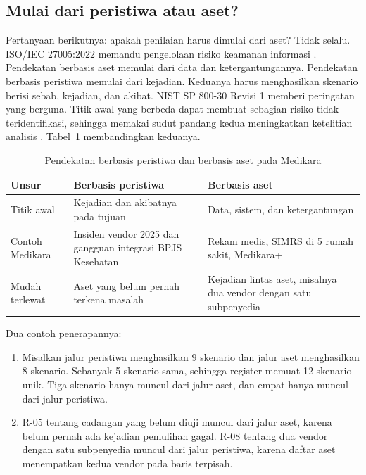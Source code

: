 \subsection*{Mulai dari peristiwa atau aset?}

Pertanyaan berikutnya: apakah penilaian harus dimulai dari aset? Tidak selalu. ISO/IEC 27005:2022
memandu pengelolaan risiko keamanan informasi \cite{iso27005-2022}. Pendekatan berbasis aset memulai
dari data dan ketergantungannya. Pendekatan berbasis peristiwa memulai dari kejadian. Keduanya harus
menghasilkan skenario berisi sebab, kejadian, dan akibat. NIST SP 800-30 Revisi 1 memberi peringatan
yang berguna. Titik awal yang berbeda dapat membuat sebagian risiko tidak teridentifikasi, sehingga
memakai sudut pandang kedua meningkatkan ketelitian analisis \cite{c05-nist-sp80030r1}.
Tabel~\ref{tab:ch05-pendekatan} membandingkan keduanya.

\begin{table}[!htb]
  \centering\small
  \caption{Pendekatan berbasis peristiwa dan berbasis aset pada Medikara}\label{tab:ch05-pendekatan}
  \begin{tabularx}{\textwidth}{|>{\raggedright\arraybackslash}p{}|>{\raggedright\arraybackslash}X|>{\raggedright\arraybackslash}X|}
    \hline
    \textbf{Unsur} & \textbf{Berbasis peristiwa} & \textbf{Berbasis aset} \\ \hline
    Titik awal & Kejadian dan akibatnya pada tujuan & Data, sistem, dan ketergantungan \\ \hline
    Contoh Medikara & Insiden vendor 2025 dan gangguan integrasi BPJS Kesehatan & Rekam medis, SIMRS
    di 5 rumah sakit, Medikara+ \\ \hline
    Mudah terlewat & Aset yang belum pernah terkena masalah & Kejadian lintas aset, misalnya dua
    vendor dengan satu subpenyedia \\ \hline
  \end{tabularx}
\end{table}

Dua contoh penerapannya:
\begin{enumerate}
  \item Misalkan jalur peristiwa menghasilkan 9 skenario dan jalur aset menghasilkan 8 skenario.
  Sebanyak 5 skenario sama, sehingga register memuat 12 skenario unik. Tiga skenario hanya muncul
  dari jalur aset, dan empat hanya muncul dari jalur peristiwa.
  \item R-05 tentang cadangan yang belum diuji muncul dari jalur aset, karena belum pernah ada
  kejadian pemulihan gagal. R-08 tentang dua vendor dengan satu subpenyedia muncul dari jalur
  peristiwa, karena daftar aset menempatkan kedua vendor pada baris terpisah.
\end{enumerate}

